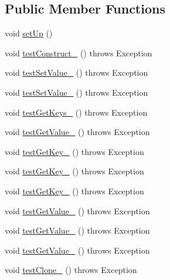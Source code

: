 \subsection*{Public Member Functions}
\begin{DoxyCompactItemize}
\item 
void \hyperlink{classorg_1_1jgap_1_1audit_1_1_keyed_values_test_aaf90ff04f53f199e90494973e0cf8044}{set\-Up} ()
\item 
void \hyperlink{classorg_1_1jgap_1_1audit_1_1_keyed_values_test_ac642fee7d81dc708ed6cf97bbb4f6d49}{test\-Construct\-\_} ()  throws Exception 
\item 
void \hyperlink{classorg_1_1jgap_1_1audit_1_1_keyed_values_test_a3e2e266bf99027dce0f6a019011fb9ae}{test\-Set\-Value\-\_} ()  throws Exception 
\item 
void \hyperlink{classorg_1_1jgap_1_1audit_1_1_keyed_values_test_a3c78e663029fb21ac7006da88bc246ac}{test\-Set\-Value\-\_} ()  throws Exception 
\item 
void \hyperlink{classorg_1_1jgap_1_1audit_1_1_keyed_values_test_ad4b8df41de7eb2eccd769b5c2d054491}{test\-Get\-Keys\-\_} ()  throws Exception 
\item 
void \hyperlink{classorg_1_1jgap_1_1audit_1_1_keyed_values_test_aa596768dd7697929f64f8b1cbd91762a}{test\-Get\-Value\-\_} ()  throws Exception 
\item 
void \hyperlink{classorg_1_1jgap_1_1audit_1_1_keyed_values_test_aa8d0846efa5175b8e79f4c1217268f42}{test\-Get\-Key\-\_} ()  throws Exception 
\item 
void \hyperlink{classorg_1_1jgap_1_1audit_1_1_keyed_values_test_ac510f3b6d96e202bf93db0f2d60d80b0}{test\-Get\-Key\-\_} ()  throws Exception 
\item 
void \hyperlink{classorg_1_1jgap_1_1audit_1_1_keyed_values_test_a4aced98c0f90028bc44a67eea233fe18}{test\-Get\-Key\-\_} ()  throws Exception 
\item 
void \hyperlink{classorg_1_1jgap_1_1audit_1_1_keyed_values_test_afa09bba9be5023e7449d4d27fb4e99e8}{test\-Get\-Value\-\_} ()  throws Exception 
\item 
void \hyperlink{classorg_1_1jgap_1_1audit_1_1_keyed_values_test_a81f9d725d1169c3108f39c318d6d2bac}{test\-Get\-Value\-\_} ()  throws Exception 
\item 
void \hyperlink{classorg_1_1jgap_1_1audit_1_1_keyed_values_test_a936602141cb8f261ceeba1ad55c58a17}{test\-Get\-Value\-\_} ()  throws Exception 
\item 
void \hyperlink{classorg_1_1jgap_1_1audit_1_1_keyed_values_test_a5f3cf0ce8c9fe5e1211ee57300c682e2}{test\-Clone\-\_} ()  throws Exception 

\end{DoxyCompactItemize}
